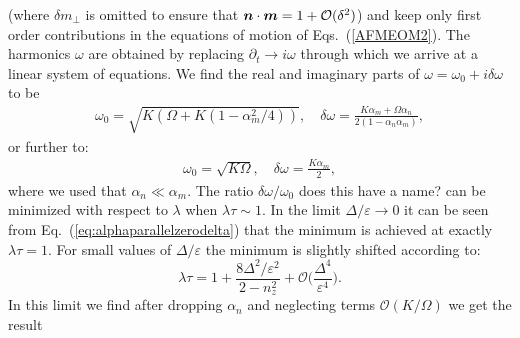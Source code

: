 (where $\delta m_\perp$ is omitted to ensure that $\boldsymbol{n}\cdot\boldsymbol{m}=1+\mathcal{O}(\delta^2)$) and keep only first order contributions in the equations of motion of Eqs.~(\ref{AFMEOM2}). The harmonics $\omega$ are obtained by replacing $\partial_t \rightarrow i\omega$ through which we arrive at a linear system of equations. We find the real and imaginary parts of $\omega = \omega_0 + i \delta\omega$ to be
\begin{align}
    \omega_0 = \sqrt{K(\Omega + K(1- \alpha_m^2 / 4))},\quad \delta\omega =  \frac{K \alpha_m + \Omega \alpha_n }{2(1- \alpha_n \alpha_m)},
\end{align}
{\color{blue} or further to:
\begin{align}
    \omega_0 = \sqrt{K\Omega},\quad \delta\omega =  \frac{K \alpha_m}{2},
\end{align}
}
where we used that $\alpha_n\ll\alpha_m$.
The ratio $\delta\omega/\omega_0$ {\color{blue} does this have a name?} can be minimized with respect to $\lambda$ when $\lambda\tau\sim1$. In the limit $\Delta/\varepsilon\rightarrow0$ it can be seen from Eq.~(\ref{eq:alphaparallelzerodelta}) that the minimum is achieved at exactly $\lambda\tau=1$. For small values of $\Delta/\varepsilon$ the minimum is slightly shifted according to:
\begin{equation}
    \lambda\tau = 1 + \frac{8\Delta^2/\varepsilon^2}{2-n_z^2}+\mathcal{O}\Big(\frac{\Delta^4}{\varepsilon^4}\Big).
\end{equation}
In this limit we find after dropping $\alpha_n$ and neglecting terms $\mathcal{O}(K/\Omega)$ we get the result

